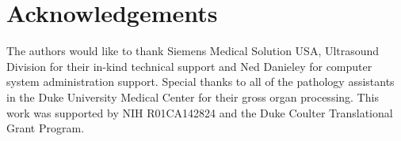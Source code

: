 \section*{Acknowledgements} 
The authors would like to thank Siemens Medical Solution USA, Ultrasound
Division for their in-kind technical support and Ned Danieley for computer
system administration support.  Special thanks to all of the pathology
assistants in the Duke University Medical Center for their gross organ
processing.  This work was supported by NIH R01CA142824 and the Duke Coulter
Translational Grant Program.
